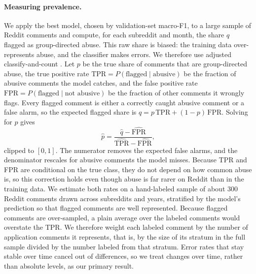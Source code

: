 \documentclass{article}
\begin{document}
\paragraph{Measuring prevalence.} We apply the best model, chosen by validation-set macro-F1, to a large sample of Reddit comments and compute, for each subreddit and month, the share $\hat q$ flagged as group-directed abuse.
This raw share is biased: the training data over-represents abuse, and the classifier makes errors.
We therefore use adjusted classify-and-count \citep{forman2008}.
Let $p$ be the true share of comments that are group-directed abuse, the true positive rate $\mathrm{TPR} = P(\text{flagged} \mid \text{abusive})$ be the fraction of abusive comments the model catches, and the false positive rate $\mathrm{FPR} = P(\text{flagged} \mid \text{not abusive})$ be the fraction of other comments it wrongly flags.
Every flagged comment is either a correctly caught abusive comment or a false alarm, so the expected flagged share is $q = p\,\mathrm{TPR} + (1-p)\,\mathrm{FPR}$.
Solving for $p$ gives
\[
  \hat p = \frac{\hat q - \widehat{\mathrm{FPR}}}{\widehat{\mathrm{TPR}} - \widehat{\mathrm{FPR}}},
\]
clipped to $[0,1]$.
The numerator removes the expected false alarms, and the denominator rescales for abusive comments the model misses.
Because TPR and FPR are conditional on the true class, they do not depend on how common abuse is, so this correction holds even though abuse is far rarer on Reddit than in the training data.
We estimate both rates on a hand-labeled sample of about 300 Reddit comments drawn across subreddits and years, stratified by the model's prediction so that flagged comments are well represented.
Because flagged comments are over-sampled, a plain average over the labeled comments would overstate the TPR.
We therefore weight each labeled comment by the number of application comments it represents, that is, by the size of its stratum in the full sample divided by the number labeled from that stratum.
Error rates that stay stable over time cancel out of differences, so we treat changes over time, rather than absolute levels, as our primary result.
\end{document}
